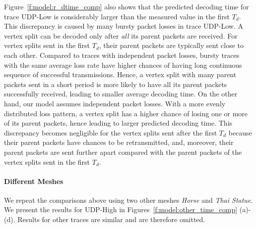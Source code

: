     Figure~\ref{f:model:r_dtime_comp} also shows that the predicted decoding time for trace \textsf{UDP-Low} is 
    considerably larger than the measured value in the first $T_d$. 
    This discrepancy is caused by many bursty packet losses in trace \textsf{UDP-Low}. 
    A vertex split %
    can be decoded only after \emph{all} its parent packets are received.
    For vertex splits sent in the first $T_d$, their parent packets
    are typically sent close to each other. Compared to traces
    with independent packet losses, 
    bursty traces with the same average loss rate have higher chances
    of having long continuous sequence of successful transmissions. 
    Hence, a vertex split with many parent packets sent in a short period is
    more likely to have all its parent packets successfully received, 
    leading to smaller average decoding time. 
    On the other hand, our model assumes independent packet losses. 
    With a more evenly distributed loss pattern,
    a vertex split has a higher chance of losing one or more of its parent
    packets, hence leading to larger predicted decoding time.
    This discrepancy becomes negligible for the vertex splits
    sent after the first $T_d$ because their parent packets have 
    chances to be retransmitted, and, moreover, their parent packets
    are sent further apart compared with the parent packets of the vertex splits sent in
    the first $T_d$. 

    \paragraph*{Different Meshes}
    We repeat the comparisons above using two other meshes
    \textit{Horse} and \textit{Thai Statue}.  We present the results
    for \textsf{UDP-High} in %
    Figures~\ref{f:model:other_time_comp} (a)-(d).
    Results for other traces are similar and are therefore omitted. 

